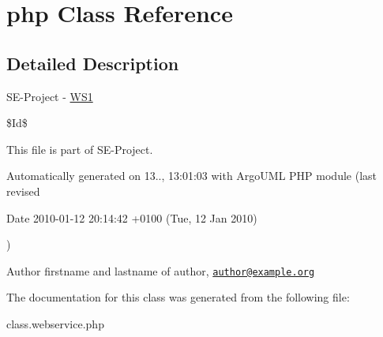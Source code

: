 \hypertarget{class_1_1webservice_1_1php}{\section{php Class Reference}
\label{class_1_1webservice_1_1php}
}


\subsection{Detailed Description}
S\+E-\/\+Project -\/ \hyperlink{namespace_w_s1}{W\+S1}

\$\+Id\$

This file is part of S\+E-\/\+Project.

Automatically generated on 13.., 13\+:01\+:03 with Argo\+U\+M\+L P\+H\+P module (last revised \begin{DoxyParagraph}{Date}
2010-\/01-\/12 20\+:14\+:42 +0100 (Tue, 12 Jan 2010) 
\end{DoxyParagraph}
)

\begin{DoxyAuthor}{Author}
firstname and lastname of author, \href{mailto:author@example.org}{\tt author@example.\+org} 
\end{DoxyAuthor}


The documentation for this class was generated from the following file\+:\begin{DoxyCompactItemize}
\item 
class.\+webservice.\+php\end{DoxyCompactItemize}
